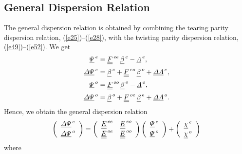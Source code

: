 \documentclass[12pt,prb,aps,notitlepage]{revtex4-1}
\begin{document}
\subsection{General  Dispersion Relation}
The general  dispersion relation is obtained by combining the tearing parity dispersion relation, (\ref{e25})--(\ref{e28}), with the
twisting parity dispersion relation, (\ref{e49})--(\ref{e52}). We get 
\begin{align}
\underline{\mit\Psi}^{\,e} &=\underline{\underline{F}}^{\,ee}\,\underline{\beta}^{\,e} - \underline{\mit\Lambda}^{\,e},\\[0.5ex]
\underline{\mit\Delta\Psi}^{\,e} &= \underline{\beta}^{\,e}+\underline{\underline{F}}^{\,eo}\,\underline{\beta}^{\,o} + \underline{\mit\Delta\Lambda}^{\,e},\\[0.5ex]
\underline{\mit\Psi}^{\,o} &= \underline{\underline{F}}^{\,oo}\,\underline{\beta}^{\,o}- \underline{\mit\Lambda}^{\,o},\\[0.5ex]
\underline{\mit\Delta\Psi}^{\,o} &= \underline{\beta}^{\,o} +\underline{\underline{F}}^{\,oe}\,\underline{\beta}^{\,e}+ \underline{\mit\Delta\Lambda}^{\,o}.
\end{align}
Hence, we obtain the general  dispersion relation
\begin{equation}
\left(\begin{array}{c}\underline{\mit\Delta\Psi}^{\,e}\\[0.5ex]\underline{\mit\Delta\Psi}^{\,o}\end{array}\right)
= \left(\begin{array}{cc} \underline{\underline{E}}^{\,ee} &\underline{\underline{E}}^{\,eo}\\[0.5ex]
\underline{\underline{E}}^{\,oe} &\underline{\underline{E}}^{\,oo}\end{array}\right)\left(\begin{array}{c}\underline{\mit\Psi}^{\,e}\\[0.5ex]\underline{\mit\Psi}^{\,o}\end{array}\right)
+\left(\begin{array}{c}\underline{\chi}^{\,e}\\[0.5ex]\underline{\chi}^{\,o}\end{array}\right)
\end{equation}
where
\end{document}
